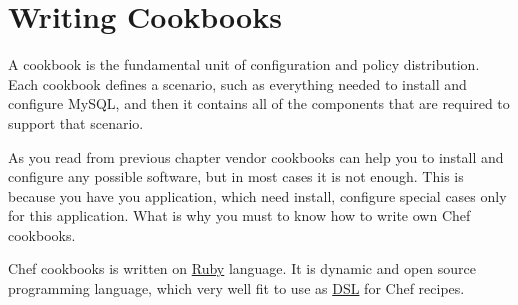 \chapter{Writing Cookbooks}

A cookbook is the fundamental unit of configuration and policy distribution. Each cookbook defines a scenario, such as everything needed to install and configure MySQL, and then it contains all of the components that are required to support that scenario.

As you read from previous chapter vendor cookbooks can help you to install and configure any possible software, but in most cases it is not enough. This is because you have you application, which need install, configure special cases only for this application. What is why you must to know how to write own Chef cookbooks.

Chef cookbooks is written on \href{https://www.ruby-lang.org}{Ruby} language. It is dynamic and open source programming language, which very well fit to use as \href{http://en.wikipedia.org/wiki/Domain-specific\_language}{DSL} for Chef recipes.








